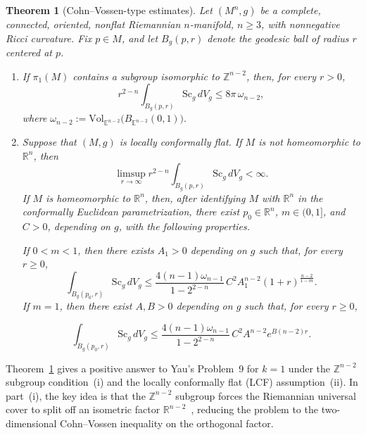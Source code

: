 \documentclass[12pt,oneside,a4paper]{article}
\newtheorem{theoremA}{Theorem}
\theoremstyle{mytheorem}
\theoremstyle{remark}
\begin{document}
 
\begin{theoremA}[Cohn--Vossen-type estimates]\label{F}
Let \((M^n,g)\) be a complete, connected, oriented, nonflat Riemannian
\(n\)-manifold, \(n\ge3\), with nonnegative Ricci curvature.  Fix
\(p\in M\), and let \(B_g(p,r)\) denote the geodesic ball of radius \(r\)
centered at \(p\).

\begin{enumerate}
\item[(i)] If \(\pi_1(M)\) contains a subgroup isomorphic to
\(\mathbb Z^{n-2}\), then, for every \(r>0\),
\[
        r^{2-n}\int_{B_g(p,r)}\mathrm{Sc}_g\,dV_g
        \le 8\pi\,\omega_{n-2},
\]
where
$\omega_{n-2} :=\mathrm{Vol}_{\mathbb E^{n-2}}\bigl(B_{\mathbb E^{n-2}}(0,1)\bigr).$

\item[(ii)] Suppose that \((M,g)\) is locally conformally flat.  If \(M\) is
not homeomorphic to \(\mathbb R^n\), then
\[
        \limsup_{r\to\infty}
        r^{2-n}\int_{B_g(p,r)}\mathrm{Sc}_g\,dV_g
        <\infty .
\]
If \(M\) is homeomorphic to \(\mathbb R^n\), then, after identifying \(M\)
with \(\mathbb R^n\) in the conformally Euclidean parametrization, there
exist \(p_0\in\mathbb R^n\), \(m\in(0,1]\), and \(C>0\), depending on \(g\),
with the following properties.

If \(0<m<1\), then there exists \(A_1>0\) depending on $g$ such that, for every \(r\ge0\),
\[
        \int_{B_g(p_0,r)}\mathrm{Sc}_g\,dV_g
        \le
        \frac{4(n-1)\omega_{n-1}}{1-2^{2-n}}\,
        C^2A_1^{n-2}(1+r)^{\frac{n-2}{1-m}} .
\]
If \(m=1\), then there exist \(A,B>0\) depending on $g$ such that, for every \(r\ge0\),

\[
        \int_{B_g(p_0,r)}\mathrm{Sc}_g\,dV_g
        \le
        \frac{4(n-1)\omega_{n-1}}{1-2^{2-n}}\,
        C^2A^{n-2}e^{B(n-2)r}.
\]

\end{enumerate}
\end{theoremA}





Theorem~\ref{F} gives a positive answer to Yau's Problem~9 for $k=1$ under
the $\mathbb{Z}^{n-2}$ subgroup condition~(i) and the locally conformally flat (LCF)
assumption~(ii).  In part~(i), the key idea is that the
$\mathbb{Z}^{n-2}$ subgroup forces the Riemannian universal cover to
split off an isometric factor $\mathbb{R}^{n-2}$~\cite{2026arXiv260114231C},
reducing the problem to the two-dimensional Cohn--Vossen inequality on
the orthogonal factor.  
\end{document}
